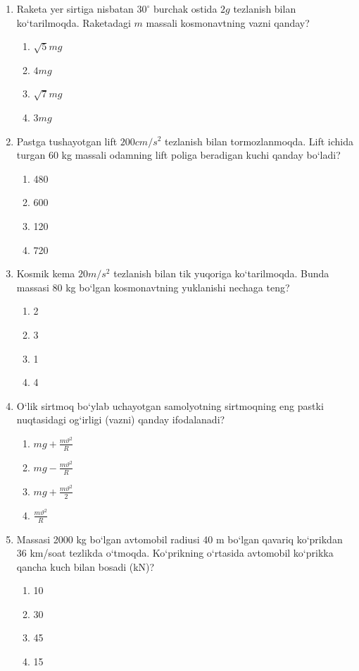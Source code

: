 \begin{enumerate}
\item Raketa yer sirtiga nisbatan $30^\circ$ burchak ostida $2g$ tezlanish bilan ko‘tarilmoqda. Raketadagi $m$ massali kosmonavtning vazni qanday?
\begin{enumerate}[label=\Alph*)]
\item $\sqrt{5}mg$
\item $4mg$
\item $\sqrt{7}mg$
\item $3mg$
\end{enumerate}

\item Pastga tushayotgan lift $200 cm/s^2$ tezlanish bilan tormozlanmoqda. Lift ichida turgan 60 kg massali odamning lift poliga beradigan kuchi qanday bo‘ladi?
\begin{enumerate}[label=\Alph*)]
\item 480
\item 600
\item 120
\item 720
\end{enumerate}

\item Kosmik kema $20 m/s^2$ tezlanish bilan tik yuqoriga ko‘tarilmoqda. Bunda massasi 80 kg bo‘lgan kosmonavtning yuklanishi nechaga teng?
\begin{enumerate}[label=\Alph*)]
\item 2
\item 3
\item 1
\item 4
\end{enumerate}

\item O‘lik sirtmoq bo‘ylab uchayotgan samolyotning sirtmoqning eng pastki nuqtasidagi og‘irligi (vazni) qanday ifodalanadi?
\begin{enumerate}[label=\Alph*)]
\item $mg + \frac{m\vartheta^2}{R}$
\item $mg - \frac{m\vartheta^2}{R}$
\item $mg + \frac{m\vartheta^2}{2}$
\item $\frac{m\vartheta^2}{R}$
\end{enumerate}

\item Massasi 2000 kg bo‘lgan avtomobil radiusi 40 m bo‘lgan qavariq ko‘prikdan 36 km/soat tezlikda o‘tmoqda. Ko‘prikning o‘rtasida avtomobil ko‘prikka qancha kuch bilan bosadi (kN)?
\begin{enumerate}[label=\Alph*)]
\item 10
\item 30
\item 45
\item 15
\end{enumerate}


\end{enumerate}
